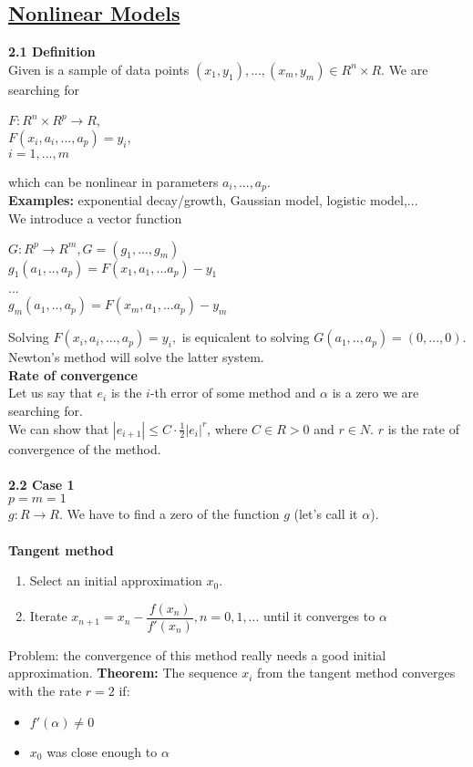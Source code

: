 \documentclass{article}
\begin{document}
\begin{multicols}{3}
\section{\underline{Nonlinear Models}}

\textbf{2.1 Definition}\\
Given is a sample of data points $(x_1, y_1),...,(x_m, y_m) \in R^n \times R$.
We are searching for
\begin{center}
$F: R^n \times R^p \rightarrow R$, \\
$F(x_i, a_i, ..., a_p) = y_i,$ \\
$i = 1,...,m$
\end{center}
which can be nonlinear in parameters $a_i,...,a_p$. \\
\textbf{Examples:} exponential decay/growth, Gaussian model, logistic model,...\\

We introduce a vector function 
\begin{center}
$G: R^p \rightarrow R^m, G = (g_1,...,g_m)$\\
$g_1(a_1,..,a_p) = F(x_1,a_1,...a_p) - y_1$\\
...\\
$g_m(a_1,..,a_p) = F(x_m,a_1,...a_p) - y_m$
\end{center}

Solving $F(x_i, a_i, ..., a_p) = y_i,$ is equicalent to solving $G(a_1,..,a_p) = (0,...,0)$. 
Newton's method will solve the latter system.\\

\textbf{Rate of convergence}\\
Let us say that $e_i$ is the $i$-th error of some method and $\alpha$ is
a zero we are searching for.\\
We can show that $|e_{i+1}| \leq C \cdot \frac{1}{2}|e_i|^r$, where $C \in R>0$ and $r \in N$. $r$ is
the rate of convergence of the method. \\ \\
\textbf{2.2 Case 1}\\
$p = m = 1$\\
$g: R \rightarrow R$. We have to find a zero of the function $g$ (let's call it $\alpha$).\\
\\
\textbf{Tangent method}
\begin{enumerate}
    \item Select an initial approximation $x_0$.
    \item Iterate $x_{n+1} = x_n - \dfrac{f(x_n)}{f'(x_n)}, n=0,1,...$ until it converges to $\alpha$
\end{enumerate}
Problem: the convergence of this method really needs a good initial approximation.
\textbf{Theorem:} The sequence $x_i$ from the tangent method converges with the rate
$r = 2$ if:
\begin{itemize}
  \item $f'(\alpha) \neq 0$
  \item $x_0$ was close enough to $\alpha$
\end{itemize}


\end{multicols}
\end{document}
